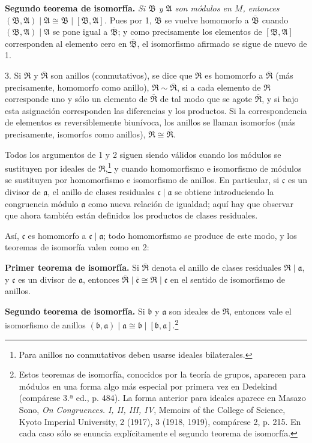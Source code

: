 \documentclass[11pt]{article}
\providecommand{\mR}{\mathfrak{R}}
\providecommand{\mA}{\mathfrak{A}}
\providecommand{\mB}{\mathfrak{B}}
\providecommand{\ma}{\mathfrak{a}}
\providecommand{\mb}{\mathfrak{b}}
\providecommand{\mc}{\mathfrak{c}}
\begin{document}
\textbf{Segundo teorema de isomorfía.} \emph{Si $\mB$ y $\mA$ son módulos en $M$, entonces $(\mB,\mA)\mid\mA\cong\mB\mid[\mB,\mA]$.} Pues por 1, $\mB$ se vuelve homomorfo a $\overline{\mB}$ cuando $(\mB,\mA)\mid\mA$ se pone igual a $\overline{\mB}$; y como precisamente los elementos de $[\mB,\mA]$ corresponden al elemento cero en $\overline{\mB}$, el isomorfismo afirmado se sigue de nuevo de 1.

3. Si $\mR$ y $\overline{\mR}$ son anillos (conmutativos), se dice que $\mR$ es homomorfo a $\overline{\mR}$ (más precisamente, homomorfo como anillo), $\mR\sim\overline{\mR}$, si a cada elemento de $\mR$ corresponde uno y sólo un elemento de $\overline{\mR}$ de tal modo que se agote $\overline{\mR}$, y si bajo esta asignación corresponden las diferencias y los productos. Si la correspondencia de elementos es reversiblemente biunívoca, los anillos se llaman isomorfos (más precisamente, isomorfos como anillos), $\mR\cong\overline{\mR}$.

Todos los argumentos de 1 y 2 siguen siendo válidos cuando los módulos se sustituyen por ideales de $\mR$,\footnote{Para anillos no conmutativos deben usarse ideales bilaterales.} y cuando homomorfismo e isomorfismo de módulos se sustituyen por homomorfismo e isomorfismo de anillos. En particular, si $\mc$ es un divisor de $\ma$, el anillo de clases residuales $\mc\mid\ma$ se obtiene introduciendo la congruencia módulo $\ma$ como nueva relación de igualdad; aquí hay que observar que ahora también están definidos los productos de clases residuales.

Así, $\mc$ es homomorfo a $\mc\mid\ma$; todo homomorfismo se produce de este modo, y los teoremas de isomorfía valen como en 2:

\textbf{Primer teorema de isomorfía.} Si $\overline{\mR}$ denota el anillo de clases residuales $\mR\mid\ma$, y $\mc$ es un divisor de $\ma$, entonces $\overline{\mR}\mid\overline{\mc}\cong\mR\mid\mc$ en el sentido de isomorfismo de anillos.

\textbf{Segundo teorema de isomorfía.} Si $\mb$ y $\ma$ son ideales de $\mR$, entonces vale el isomorfismo de anillos $(\mb,\ma)\mid\ma\cong\mb\mid[\mb,\ma]$.\footnote{Estos teoremas de isomorfía, conocidos por la teoría de grupos, aparecen para módulos en una forma algo más especial por primera vez en Dedekind (compárese 3.ª ed., p. 484). La forma anterior para ideales aparece en Masazo Sono, \emph{On Congruences. I, II, III, IV}, Memoirs of the College of Science, Kyoto Imperial University, 2 (1917), 3 (1918, 1919), compárese 2, p. 215. En cada caso sólo se enuncia explícitamente el segundo teorema de isomorfía.}
\end{document}
